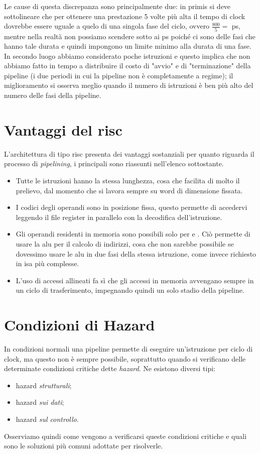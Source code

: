 \documentclass[class=book, crop=false, oneside]{standalone}
\begin{document}
Le cause di questa discrepanza sono principalmente due: in primis si deve sottolineare che per ottenere una prestazione 5 volte più alta il tempo di clock dovrebbe essere uguale a quelo di una singola fase del ciclo, ovvero \(\frac{800}{5}=\) \unit[160]{ps}, mentre nella realtà non possiamo scendere sotto ai \unit[200]{ps} poiché ci sono delle fasi che hanno tale durata e quindi impongono un limite minimo alla durata di una fase. In secondo luogo abbiamo considerato poche istruzioni e questo implica che non abbiamo fatto in tempo a distribuire il costo di "avvio" e di "terminazione" della pipeline (i due periodi in cui la pipeline non è completamente a regime); il miglioramento si osserva meglio quando il numero di istruzioni è ben più alto del numero delle fasi della pipeline.

\section{Vantaggi del \acrshort{risc}}
L'architettura di tipo \acrshort{risc} presenta dei vantaggi sostanziali per quanto riguarda il processo di \emph{pipelining}, i principali sono riassunti nell'elenco sottostante.
\begin{itemize}
	\item Tutte le istruzioni hanno la stessa lunghezza, cosa che facilita di molto il prelievo, dal momento che si lavora sempre su word di dimensione fissata.
	\item I codici degli operandi sono in posizione fissa, questo permette di accedervi leggendo il file register in parallelo con la decodifica dell’istruzione.
	\item Gli operandi residenti in memoria sono possibili solo per  e . Ciò permette di usare la \acrshort{alu} per il calcolo di indirizzi, cosa che non sarebbe possibile se dovessimo usare le \acrshort{alu} in due fasi della stessa istruzione, come invece richiesto in \acrshort{isa} più complesse.
	\item  L’uso di accessi allineati fa sì che gli accessi in memoria avvengano sempre in un ciclo di trasferimento, impegnando quindi un solo stadio della pipeline.
\end{itemize}

\section{Condizioni di Hazard}
In condizioni normali una pipeline permette di eseguire un'istruzione per ciclo di clock, ma questo non è sempre possibile, soprattutto quando si verificano delle determinate condizioni critiche dette \emph{hazard}. Ne esistono diversi tipi:
\begin{itemize}
	\item hazard \emph{strutturali};
	\item hazard \emph{sui dati};
	\item hazard \emph{sul controllo}.
\end{itemize}
Osserviamo quindi come vengono a verificarsi queste condizioni critiche e quali sono le soluzioni più comuni adottate per risolverle.
\end{document}
